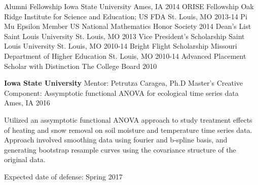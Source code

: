 \documentclass[11pt, a4paper]{awesome-cv}
\begin{document}
\begin{cvhonors}
  \cvhonor
    {Alumni Fellowship}
    {Iowa State University}
    {Ames, IA}
    {2014}
  \cvhonor
    {ORISE Fellowship}
    {Oak Ridge Institute for Science and Education; US FDA}
    {St. Louis, MO}
    {2013-14}
    \cvhonor
    {Pi Mu Epsilon Member}
    {US National Mathematics Honor Society}
    {}
    {2014}
  \cvhonor
    {Dean's List}
    {Saint Louis University}
    {St. Louis, MO}
    {2013}
   \cvhonor
    {Vice President's Scholarship}
    {Saint Louis University}
    {St. Louis, MO}
    {2010-14}
  \cvhonor
    {Bright Flight Scholarship}
    {Missouri Department of Higher Education}
    {St. Louis, MO}
    {2010-14}
  \cvhonor
    {Advanced Placement Scholar with Distinction}
    {The College Board}
    {}
    {2010}
\end{cvhonors}

\begin{cventries}
\cventry
    {\textbf{Iowa State University} \newline Mentor: Petrutza Caragea, Ph.D}
    {Master's Creative Component: \newline Assymptotic functional ANOVA for ecological time series data}
    {Ames, IA}
    {2016}
    {
      \begin{cvitems}
        \item Utilized an assymptotic functional ANOVA approach to study treatment effects of heating and snow removal on soil moisture and temperature time series data. Approach involved smoothing data using fourier and b-spline basis, and generating bootstrap resample curves using the covariance structure of the original data.   
        \item Expected date of defense: Spring 2017
      \end{cvitems}
    }
\end{cventries}
\end{document}
